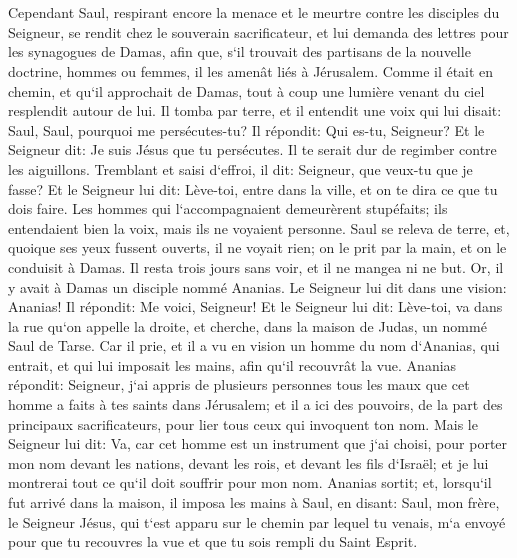 \chapter{}

\verse Cependant Saul, respirant encore la menace et le meurtre contre les disciples du Seigneur, se rendit chez le souverain sacrificateur, 
\verse et lui demanda des lettres pour les synagogues de Damas, afin que, s`il trouvait des partisans de la nouvelle doctrine, hommes ou femmes, il les amenât liés à Jérusalem. 
\verse Comme il était en chemin, et qu`il approchait de Damas, tout à coup une lumière venant du ciel resplendit autour de lui. 
\verse Il tomba par terre, et il entendit une voix qui lui disait: Saul, Saul, pourquoi me persécutes-tu? 
\verse Il répondit: Qui es-tu, Seigneur? Et le Seigneur dit: Je suis Jésus que tu persécutes. Il te serait dur de regimber contre les aiguillons. 
\verse Tremblant et saisi d`effroi, il dit: Seigneur, que veux-tu que je fasse? Et le Seigneur lui dit: Lève-toi, entre dans la ville, et on te dira ce que tu dois faire. 
\verse Les hommes qui l`accompagnaient demeurèrent stupéfaits; ils entendaient bien la voix, mais ils ne voyaient personne. 
\verse Saul se releva de terre, et, quoique ses yeux fussent ouverts, il ne voyait rien; on le prit par la main, et on le conduisit à Damas. 
\verse Il resta trois jours sans voir, et il ne mangea ni ne but. 
\verse Or, il y avait à Damas un disciple nommé Ananias. Le Seigneur lui dit dans une vision: Ananias! Il répondit: Me voici, Seigneur! 
\verse Et le Seigneur lui dit: Lève-toi, va dans la rue qu`on appelle la droite, et cherche, dans la maison de Judas, un nommé Saul de Tarse. 
\verse Car il prie, et il a vu en vision un homme du nom d`Ananias, qui entrait, et qui lui imposait les mains, afin qu`il recouvrât la vue. Ananias répondit: 
\verse Seigneur, j`ai appris de plusieurs personnes tous les maux que cet homme a faits à tes saints dans Jérusalem; 
\verse et il a ici des pouvoirs, de la part des principaux sacrificateurs, pour lier tous ceux qui invoquent ton nom. 
\verse Mais le Seigneur lui dit: Va, car cet homme est un instrument que j`ai choisi, pour porter mon nom devant les nations, devant les rois, et devant les fils d`Israël; 
\verse et je lui montrerai tout ce qu`il doit souffrir pour mon nom. 
\verse Ananias sortit; et, lorsqu`il fut arrivé dans la maison, il imposa les mains à Saul, en disant: Saul, mon frère, le Seigneur Jésus, qui t`est apparu sur le chemin par lequel tu venais, m`a envoyé pour que tu recouvres la vue et que tu sois rempli du Saint Esprit. 
